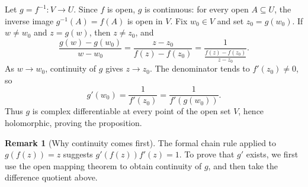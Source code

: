\documentclass[11pt]{article}
\theoremstyle{plain}
\theoremstyle{definition}
\theoremstyle{boldremark}
\newtheorem*{remark}{Remark}
\theoremstyle{remark}
\numberwithin{equation}{section}
\begin{document}
Let $g=f^{-1}:V\to U$. Since $f$ is open, $g$ is continuous: for every
open $A\subseteq U$, the inverse image $g^{-1}(A)=f(A)$ is open in $V$.
Fix $w_0\in V$ and set $z_0=g(w_0)$. If $w\ne w_0$ and $z=g(w)$, then
$z\ne z_0$, and
\[
 \frac{g(w)-g(w_0)}{w-w_0}
 =\frac{z-z_0}{f(z)-f(z_0)}
 =\frac{1}{\displaystyle\frac{f(z)-f(z_0)}{z-z_0}}.
\]
As $w\to w_0$, continuity of $g$ gives $z\to z_0$. The denominator tends
to $f'(z_0)\ne0$, so
\[
 g'(w_0)=\frac{1}{f'(z_0)}=\frac{1}{f'(g(w_0))}.
\]
Thus $g$ is complex differentiable at every point of the open set $V$,
hence holomorphic, proving the proposition.


\begin{remark}[Why continuity comes first]
The formal chain rule applied to $g(f(z))=z$ suggests
$g'(f(z))f'(z)=1$. To prove that $g'$ exists, we first use the open mapping
theorem to obtain continuity of $g$, and then take the difference
quotient above.
\end{remark}
\end{document}
